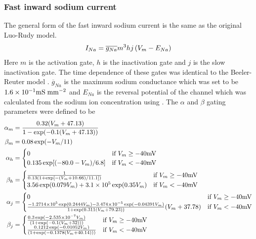 \subsubsection{Fast inward sodium current}
The general form of the fast inward sodium current is the same as the original
Luo-Rudy model.
\begin{equation}
  I_{Na}=\overline{g_{Na}}m^3hj\left( V_m-E_{Na} \right)
\end{equation}
Here $m$ is the activation gate, $h$ is the inactivation gate and $j$ is the slow
inactivation gate. The time dependence of these gates was identical to the
Beeler-Reuter model . $\overline{g}_{Na}$ is
the maximum sodium conductance which was set to be $1.6 \times 10^{-1}
\mathrm{mS}\thickspace\mathrm{mm}^{-2}$ and $E_{Na}$ is the reversal potential of the
channel which was calculated from the sodium ion concentration using
. The $\alpha$ and $\beta$ gating parameters were
defined to be
\begin{gather}
  \label{eqn:lr2_ina_coeffs}%
  \begin{aligned}
    \alpha_m &= {0.32  (V_m+47.13) \over 1-\exp(-0.1(V_m+47.13))} \\
    \beta_m &= 0.08  \exp(-V_m / 11) \\
    \alpha_h &=
    \begin{cases}
      0 & \text{if $V_m \geq -40 \mV$} \\
      0.135  \exp[(-80.0-V_m) / 6.8] & \text{if $V_m < -40 \mV$}
    \end{cases} \\
    \beta_h &=
    \begin{cases}
      \frac{1}{0.13  (1 + \exp[- (V_m+10.66) / 11.1])} &
      \text{if $V_m \geq -40 \mV$} \\
      3.56  \exp(0.079 V_m) + \nttento{3.1}{5}  \exp(0.35  V_m) & 
      \text{if $V_m < -40 \mV$}
    \end{cases} \\
    \alpha_j &= 
    \begin{cases}%
      0 & \text{if $V_m \geq -40 \mV$} \\
      \frac{\nttento{-1.2714}{5} \exp(0.2444 V_m) - \nttento{3.474}{-5} 
      \exp(-0.04391 V_m)}{1+\exp\left(0.311 (V_m+79.23) \right)} (V_m+37.78)&
      \text{if $V_m < -40 \mV$}
    \end{cases} \\
    \beta_j &=
    \begin{cases}%
      0.3  \exp(\nttento{-2.535}{-7}  V_m) \over \left(1+\exp\left(-0.1 
          (V_m+32) \right) \right) & \text{if $V_m \geq -40 \mV$} \\
      0.1212  \exp( -0.01052  V_m) \over \left(1+\exp\left(-0.1378 
          (V_m+40.14) \right) \right)
      & \text{if $V_m < -40 \mV$}
    \end{cases}
  \end{aligned}
\end{gather}
%
